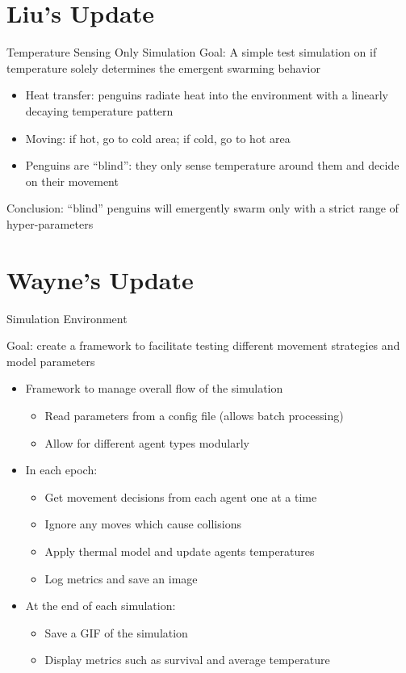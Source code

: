 \documentclass[handout,9pt]{beamer}
\begin{document}
	\section{Liu's Update}
	\begin{frame}{Temperature Sensing Only Simulation}
		Goal: A simple test simulation on if temperature solely determines the
		emergent swarming behavior
		\begin{itemize}
			\item Heat transfer: penguins radiate heat into the environment with a
				linearly decaying temperature pattern
			\item Moving: if hot, go to cold area; if cold, go to hot area
			\item Penguins are ``blind'': they only sense temperature around them and
				decide on their movement
		\end{itemize}
		Conclusion: ``blind'' penguins will emergently swarm only with a strict
		range of hyper-parameters
	\end{frame}

	\section{Wayne's Update}
	\begin{frame}{Simulation Environment}
		\par Goal: create a framework to facilitate testing different movement
		strategies and model parameters \\
		\begin{itemize}
			\item Framework to manage overall flow of the simulation
				\begin{itemize}
					\item Read parameters from a config file (allows batch processing)
					\item Allow for different agent types modularly
				\end{itemize}
			\item In each epoch:
				\begin{itemize}
					\item Get movement decisions from each agent one at a time
					\item Ignore any moves which cause collisions
					\item Apply thermal model and update agents temperatures
					\item Log metrics and save an image
				\end{itemize}
			\item At the end of each simulation:
				\begin{itemize}
					\item Save a GIF of the simulation
					\item Display metrics such as survival and average temperature
				\end{itemize}
		\end{itemize}
	\end{frame}
\end{document}
